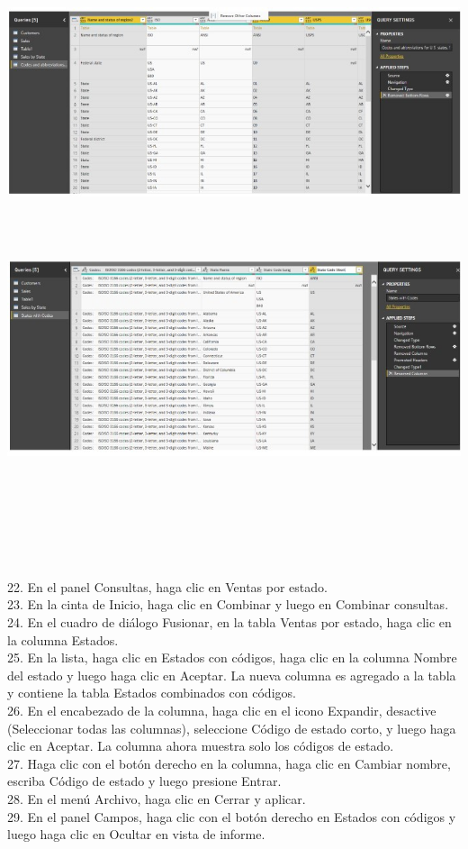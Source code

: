 \begin{flushleft}
\begin{itemize}
\textbf{ }\\
\begin{center}
	\includegraphics[width=15cm]{./Imagenes/image31} 
	\end{center}
\textbf{ }\\
\textbf{ }\\
\begin{center}
	\includegraphics[width=15cm]{./Imagenes/image32} 
	\end{center}
\textbf{ }\\
\textbf{ }\\
\textbf{ }\\
\textbf{ }\\
\textbf{ }\\
\textbf{ }\\
22. En el panel Consultas, haga clic en Ventas por estado.\\
23. En la cinta de Inicio, haga clic en Combinar y luego en Combinar consultas.\\
24. En el cuadro de diálogo Fusionar, en la tabla Ventas por estado, haga clic en la columna Estados.\\
25. En la lista, haga clic en Estados con códigos, haga clic en la columna Nombre del estado y luego haga clic en Aceptar. La nueva columna es
agregado a la tabla y contiene la tabla Estados combinados con códigos.\\
26. En el encabezado de la columna, haga clic en el icono Expandir, desactive (Seleccionar todas las columnas), seleccione Código de estado corto,
y luego haga clic en Aceptar. La columna ahora muestra solo los códigos de estado.\\
27. Haga clic con el botón derecho en la columna, haga clic en Cambiar nombre, escriba Código de estado y luego presione Entrar.\\
28. En el menú Archivo, haga clic en Cerrar y aplicar.\\
29. En el panel Campos, haga clic con el botón derecho en Estados con códigos y luego haga clic en Ocultar en vista de informe.\\


\end{itemize}
\end{flushleft}
